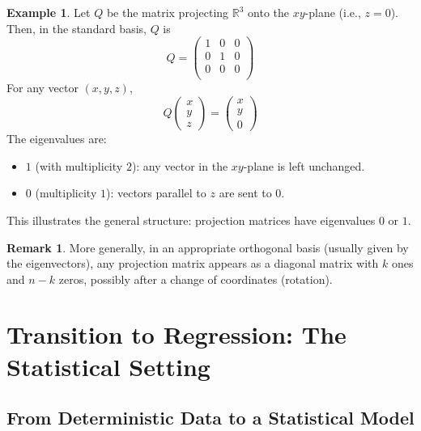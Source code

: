 \documentclass[11pt]{article}
\theoremstyle{definition}
\theoremstyle{plain}
\theoremstyle{definition}
\newtheorem{example}[definition]{Example}
\newtheorem{remark}[definition]{Remark}
\begin{document}
\begin{example}
\label{projection_r3_onto_plane}
Let $Q$ be the matrix projecting $\mathbb{R}^3$ onto the $xy$-plane (i.e., $z=0$). Then, in the standard basis, $Q$ is
\[
Q = \begin{pmatrix}
1 & 0 & 0 \\
0 & 1 & 0 \\
0 & 0 & 0 \\
\end{pmatrix}
\]
For any vector $(x, y, z)$,
\[
Q \begin{pmatrix}x\\y\\z\end{pmatrix} = \begin{pmatrix}x\\y\\0\end{pmatrix}
\]
The eigenvalues are:
\begin{itemize}
    \item $1$ (with multiplicity $2$): any vector in the $xy$-plane is left unchanged.
    \item $0$ (multiplicity $1$): vectors parallel to $z$ are sent to $0$.
\end{itemize}
This illustrates the general structure: projection matrices have eigenvalues $0$ or $1$.
\end{example}

\begin{remark}
More generally, in an appropriate orthogonal basis (usually given by the eigenvectors), any projection matrix appears as a diagonal matrix with $k$ ones and $n-k$ zeros, possibly after a change of coordinates (rotation).
\end{remark}

\section{Transition to Regression: The Statistical Setting}

\subsection{From Deterministic Data to a Statistical Model}
\end{document}
